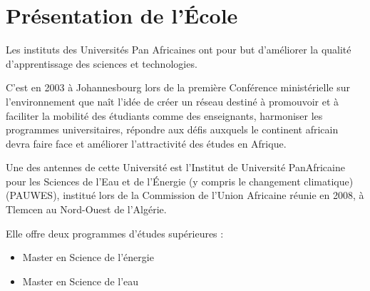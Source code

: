 \documentclass[oneside]{report}
\begin{document}
	\chapter{Présentation de l'École}
	{
		
		\par Les instituts des Universités Pan Africaines ont pour but d’améliorer la qualité d'apprentissage des sciences et technologies.
		\vspace{1cm}
		\par C’est en 2003 à Johannesbourg lors de la première Conférence ministérielle sur l’environnement que naît l’idée de créer un réseau destiné à promouvoir et à faciliter la mobilité des étudiants comme des enseignants, harmoniser les programmes universitaires, répondre aux défis auxquels le continent africain devra faire face et améliorer l’attractivité des études en Afrique.
		\vspace{1cm}
		\par Une des antennes de cette Université est l’Institut de Université PanAfricaine pour les Sciences de l’Eau et de l'Énergie (y compris le changement climatique) (PAUWES), institué lors de la Commission de l’Union Africaine réunie en 2008, à Tlemcen au Nord-Ouest de l’Algérie. 
		\vspace{1cm}
		\par Elle offre deux programmes d’études supérieures :
		\begin{itemize}
			\item{Master en Science de l’énergie}
			\item{Master en Science de l’eau}
		\end{itemize}
	}
\end{document}
